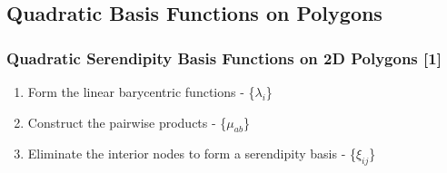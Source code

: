 \documentclass[compress,10pt]{beamer}
\begin{document}
\subsection{Quadratic Basis Functions on Polygons}
\begin{frame}[t]\frametitle{Quadratic Serendipity Basis Functions on 2D Polygons [1]}
\begin{block}{}
\begin{enumerate}
	\item <1-> Form the linear barycentric functions - \{$\lambda_i$\}
	\item <2-> Construct the pairwise products -  \{$\mu_{ab}$\}
	\item <3-> Eliminate the interior nodes to form a serendipity basis - \{$\xi_{ij}$\}
\end{enumerate}
\end{block}
\vspace{1cm}
\begin{columns}[c]
\centering
{}
\centering
{}
\end{columns}
\end{frame}
\end{document}
